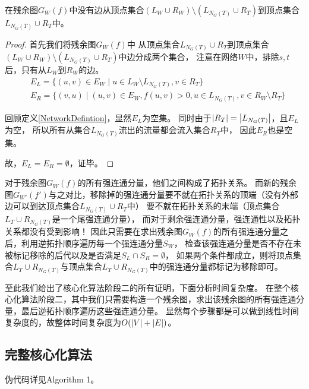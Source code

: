 \begin{claim} \label{residualgraph4}
在残余图$G_W(f)$中没有边从顶点集合$(L_W \cup R_W) \setminus (L_{N_G(T)} \cup R_T)$到顶点集合$L_{N_G(T)} \cup R_T$中。
\end{claim}
\begin{proof}
首先我们将残余图$G_W(f)$中
从顶点集合$L_{N_G(T)} \cup R_T$到顶点集合$(L_W \cup R_W) \setminus (L_{N_G(T)} \cup R_T)$中边分成两个集合，
注意在网络$W$中，排除$s, t$后，只有从$L_W$到$R_W$的边。
  \begin{equation*} \begin{aligned}
    & E_L = \{(u, v) \in E_W\;|\;u \in L_W \setminus L_{N_G(T)},v \in R_T\} \\
    & E_R = \{(v, u)\;|\;(u, v) \in E_W,f(u, v) > 0,u \in L_{N_G(T)},v \in R_W \setminus R_T\}
  \end{aligned} \end{equation*}

回顾定义\ref{NetworkDefintion}，显然$E_L$为空集。
同时由于$\left\vert R_T \right\vert = \left\vert L_{N_G(T)} \right\vert$，且$E_L$为空，
所以所有从集合$L_{N_G(T)}$流出的流量都会流入集合$R_T$中，
因此$E_R$也是空集。

故，$E_L = E_R = \emptyset$，证毕。
\end{proof}



对于残余图$G_W(f)$的所有强连通分量，他们之间构成了拓扑关系。
而新的残余图$G_{W'}(f')$与之对比，移除掉的强连通分量要不就在拓扑关系的顶端（没有外部边可以到达顶点集合$L_{N_G(T)} \cup R_T$中）
要不就在拓扑关系的末端（顶点集合$L_T \cup R_{N_G(T)}$是一个尾强连通分量），
而对于剩余强连通分量，强连通性以及拓扑关系都没有受到影响！
因此只需要在求出残余图$G_W(f)$的所有强连通分量之后，利用逆拓扑顺序遍历每一个强连通分量$S_W$，
检查该强连通分量是否不存在未被标记移除的后代以及是否满足$S_L \cap S_R = \emptyset$，
如果两个条件都成立，则将顶点集合$L_T \cup R_{N_G(T)}$与顶点集合$L_T \cup R_{N_G(T)}$中的强连通分量都标记为移除即可。


至此我们给出了核心化算法阶段二的所有证明，下面分析时间复杂度。
在整个核心化算法阶段二，其中我们只需要构造一个残余图，求出该残余图的所有强连通分量，最后逆拓扑顺序遍历这些强连通分量。
显然每个步骤都是可以做到线性时间复杂度的，故整体时间复杂度为$O(\left\vert V \right\vert + \left\vert E \right\vert)$。

\subsection{完整核心化算法}

伪代码详见Algorithm 1。

